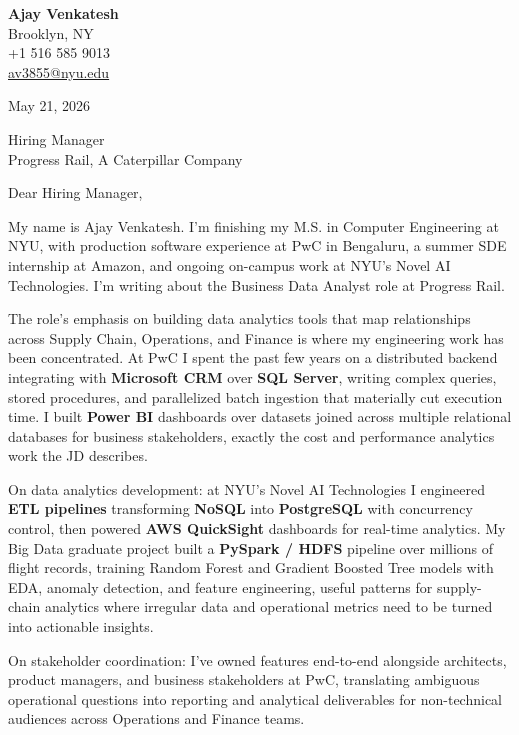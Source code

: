 \documentclass[letterpaper,11pt]{article}
\begin{document}
\begin{flushleft}
\textbf{\large Ajay Venkatesh} \\
Brooklyn, NY \\
+1 516 585 9013 \\
\href{mailto:av3855@nyu.edu}{av3855@nyu.edu}
\end{flushleft}
\vspace{10pt}
May 21, 2026
\vspace{6pt}

Hiring Manager \\
Progress Rail, A Caterpillar Company

\vspace{10pt}

Dear Hiring Manager,

My name is Ajay Venkatesh. I'm finishing my M.S. in Computer Engineering at NYU, with production software experience at PwC in Bengaluru, a summer SDE internship at Amazon, and ongoing on-campus work at NYU's Novel AI Technologies. I'm writing about the Business Data Analyst role at Progress Rail.

The role's emphasis on building data analytics tools that map relationships across Supply Chain, Operations, and Finance is where my engineering work has been concentrated. At PwC I spent the past few years on a distributed backend integrating with \textbf{Microsoft CRM} over \textbf{SQL Server}, writing complex queries, stored procedures, and parallelized batch ingestion that materially cut execution time. I built \textbf{Power BI} dashboards over datasets joined across multiple relational databases for business stakeholders, exactly the cost and performance analytics work the JD describes.

On data analytics development: at NYU's Novel AI Technologies I engineered \textbf{ETL pipelines} transforming \textbf{NoSQL} into \textbf{PostgreSQL} with concurrency control, then powered \textbf{AWS QuickSight} dashboards for real-time analytics. My Big Data graduate project built a \textbf{PySpark / HDFS} pipeline over millions of flight records, training Random Forest and Gradient Boosted Tree models with EDA, anomaly detection, and feature engineering, useful patterns for supply-chain analytics where irregular data and operational metrics need to be turned into actionable insights.

On stakeholder coordination: I've owned features end-to-end alongside architects, product managers, and business stakeholders at PwC, translating ambiguous operational questions into reporting and analytical deliverables for non-technical audiences across Operations and Finance teams.
\end{document}
